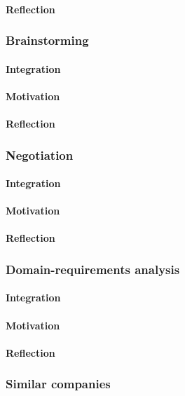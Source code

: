 \documentclass[10pt]{article}
\begin{document}
\paragraph{Reflection}


\subsubsection{Brainstorming}
\paragraph{Integration}
\paragraph{Motivation}
\paragraph{Reflection}


\subsubsection{Negotiation}
\paragraph{Integration}
\paragraph{Motivation}
\paragraph{Reflection}


\subsubsection{Domain-requirements analysis}
\paragraph{Integration}
\paragraph{Motivation}
\paragraph{Reflection}


\subsubsection{Similar companies}
\end{document}
